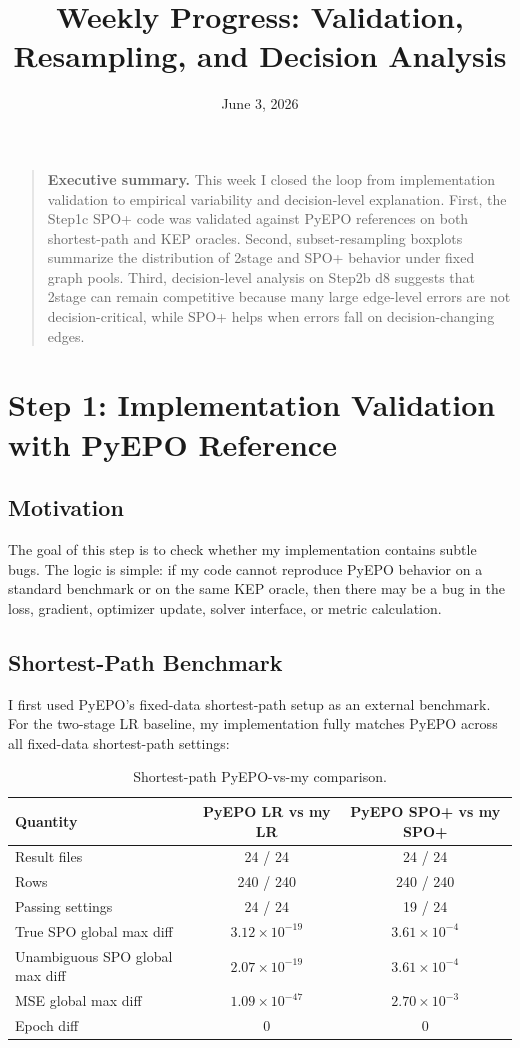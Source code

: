 \documentclass[11pt]{article}
\title{Weekly Progress: Validation, Resampling, and Decision Analysis}
\author{}
\date{June 3, 2026}
\begin{document}
\maketitle

\begin{quote}
\textbf{Executive summary.}
This week I closed the loop from implementation validation to empirical
variability and decision-level explanation. First, the Step1c SPO+ code was
validated against PyEPO references on both shortest-path and KEP oracles.
Second, subset-resampling boxplots summarize the distribution of 2stage and
SPO+ behavior under fixed graph pools. Third, decision-level analysis on
Step2b d8 suggests that 2stage can remain competitive because many large
edge-level errors are not decision-critical, while SPO+ helps when errors fall
on decision-changing edges.
\end{quote}

\section{Step 1: Implementation Validation with PyEPO Reference}
\label{sec:implementation-validation}

\subsection{Motivation}
The goal of this step is to check whether my implementation contains subtle
bugs. The logic is simple: if my code cannot reproduce PyEPO behavior on a
standard benchmark or on the same KEP oracle, then there may be a bug in the
loss, gradient, optimizer update, solver interface, or metric calculation.

\subsection{Shortest-Path Benchmark}
I first used PyEPO's fixed-data shortest-path setup as an external benchmark.
For the two-stage LR baseline, my implementation fully matches PyEPO across all
fixed-data shortest-path settings:

\begin{table}[h]
\centering
\small
\caption{Shortest-path PyEPO-vs-my comparison.}
\label{tab:shortest-path-validation}
\begin{tabular}{lcc}
\toprule
Quantity & PyEPO LR vs my LR & PyEPO SPO+ vs my SPO+ \\
\midrule
Result files & 24 / 24 & 24 / 24 \\
Rows & 240 / 240 & 240 / 240 \\
Passing settings & 24 / 24 & 19 / 24 \\
True SPO global max diff & $3.12\times 10^{-19}$ & $3.61\times 10^{-4}$ \\
Unambiguous SPO global max diff & $2.07\times 10^{-19}$ & $3.61\times 10^{-4}$ \\
MSE global max diff & $1.09\times 10^{-47}$ & $2.70\times 10^{-3}$ \\
Epoch diff & 0 & 0 \\
\bottomrule
\end{tabular}
\end{table}
\end{document}
